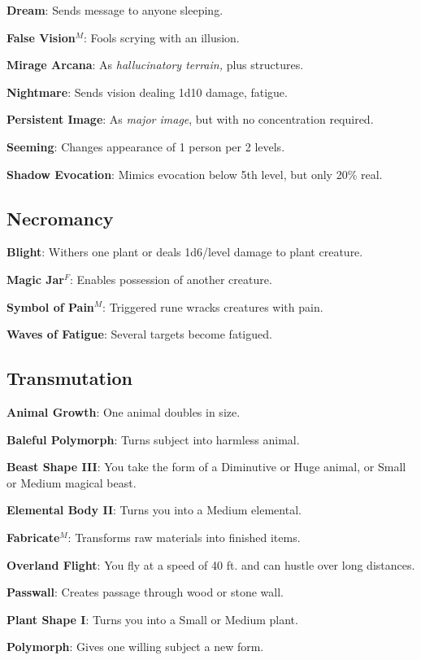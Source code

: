 \textbf{Dream}: Sends message to anyone sleeping.

\textbf{False Vision}\(^{M}\): Fools scrying with an illusion.

\textbf{Mirage Arcana}: As \textit{hallucinatory terrain, }plus structures.

\textbf{Nightmare}: Sends vision dealing 1d10 damage, fatigue.

\textbf{Persistent Image}: As \textit{major image}, but with no concentration required.

\textbf{Seeming}: Changes appearance of 1 person per 2 levels.

\textbf{Shadow Evocation}: Mimics evocation below 5th level, but only 20\% real.

\subsection{Necromancy}


\textbf{Blight}: Withers one plant or deals 1d6/level damage to plant creature.

\textbf{Magic Jar}\(^{F}\): Enables possession of another creature.

\textbf{Symbol of Pain}\(^{M}\): Triggered rune wracks creatures with pain.

\textbf{Waves of Fatigue}: Several targets become fatigued.

\subsection{Transmutation}


\textbf{Animal Growth}: One animal doubles in size.

\textbf{Baleful Polymorph}: Turns subject into harmless animal.

\textbf{Beast Shape III}: You take the form of a Diminutive or Huge animal, or Small or Medium magical beast.

\textbf{Elemental Body II}: Turns you into a Medium elemental.

\textbf{Fabricate}\(^{M}\): Transforms raw materials into finished items.

\textbf{Overland Flight}: You fly at a speed of 40 ft. and can hustle over long distances.

\textbf{Passwall}: Creates passage through wood or stone wall.

\textbf{Plant Shape I}: Turns you into a Small or Medium plant.

\textbf{Polymorph}: Gives one willing subject a new form.

